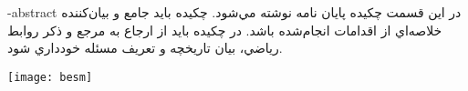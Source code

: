 
\fa-abstract{
در اين قسمت چكيده پایان نامه نوشته مي‌شو‌د‌.‌ چكيده بايد جامع و بيان‌كننده‌ خلاصه‌اي از اقدامات انجام‌شده باشد. در چكيده باید از ارجاع به مرجع و ذكر روابط رياضي، بيان تاريخچه و تعريف مسئله خودداري ‌شود. 
}





\AUTtitle
\vspace*{7cm}
\thispagestyle{empty}
\begin{center}
\texttt{[image: besm]}
\end{center}